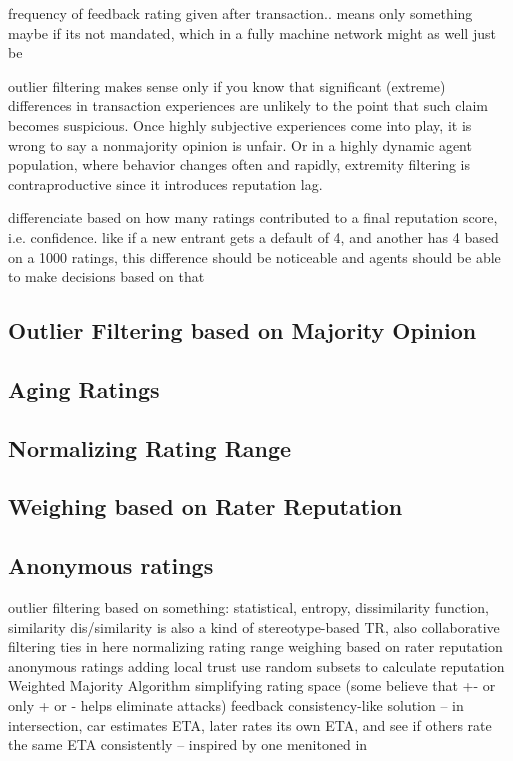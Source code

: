 \documentclass[%
    ]{\PathToTumTemplate/thesis/tum_thesis}
\begin{document}
frequency of feedback rating given after transaction.. means only something maybe if its not mandated, which in a fully machine network might as well just be

outlier filtering makes sense only if you know that significant (extreme) differences in transaction experiences are unlikely to the point that such claim becomes suspicious. Once highly subjective experiences come into play, it is wrong to say a nonmajority opinion is unfair. Or in a highly dynamic agent population, where behavior changes often and rapidly, extremity filtering is contraproductive since it introduces reputation lag.



differenciate based on how many ratings contributed to a final reputation score, i.e. confidence. like if a new entrant gets a default of 4, and another has 4 based on a 1000 ratings, this difference should be noticeable and agents should be able to make decisions based on that

\subsection{Outlier Filtering based on Majority Opinion}

\subsection{Aging Ratings}

\subsection{Normalizing Rating Range}

\subsection{Weighing based on Rater Reputation}

\subsection{Anonymous ratings}


outlier filtering based on something: statistical, entropy, dissimilarity function, similarity
dis/similarity is also a kind of stereotype-based TR, also collaborative filtering ties in here
normalizing rating range
weighing based on rater reputation
anonymous ratings
adding local trust
use random subsets to calculate reputation
Weighted Majority Algorithm 
simplifying rating space (some believe that +- or only + or - helps eliminate attacks)
feedback consistency-like solution -- in intersection, car estimates ETA, later rates its own ETA, and see if others rate the same ETA consistently -- inspired by one menitoned in \cite{azzedin_identifying_2010}
\end{document}
